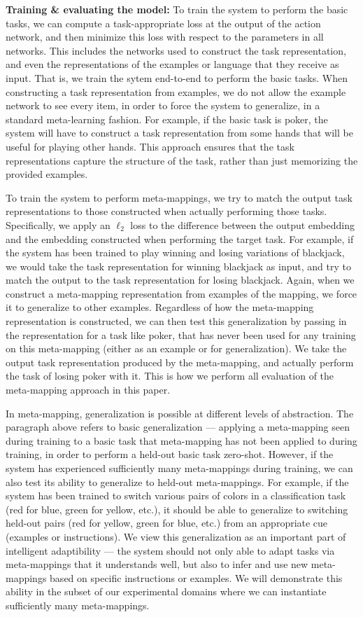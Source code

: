 \textbf{Training \& evaluating the model:} To train the system to perform the basic tasks, we can compute a task-appropriate loss at the output of the action network, and then minimize this loss with respect to the parameters in all networks. This includes the networks used to construct the task representation, and even the representations of the examples or language that they receive as input. That is, we train the sytem end-to-end to perform the basic tasks. When constructing a task representation from examples, we do not allow the example network to see every item, in order to force the system to generalize, in a standard meta-learning fashion. For example, if the basic task is poker, the system will have to construct a task representation from some hands that will be useful for playing other hands. This approach ensures that the task representations capture the structure of the task, rather than just memorizing the provided examples. 

To train the system to perform meta-mappings, we try to match the output task representations to those constructed when actually performing those tasks. Specifically, we apply an \(\ell_2\) loss to the difference between the output embedding and the embedding constructed when performing the target task. For example, if the system has been trained to play winning and losing variations of blackjack, we would take the task representation for winning blackjack as input, and try to match the output to the task representation for losing blackjack. Again, when we construct a meta-mapping representation from examples of the mapping, we force it to generalize to other examples. Regardless of how the meta-mapping representation is constructed, we can then test this generalization by passing in the representation for a task like poker, that has never been used for any training on this meta-mapping (either as an example or for generalization). We take the output task representation produced by the meta-mapping, and actually perform the task of losing poker with it. This is how we perform all evaluation of the meta-mapping approach in this paper.

In meta-mapping, generalization is possible at different levels of abstraction. The paragraph above refers to basic generalization --- applying a meta-mapping seen during training to a basic task that meta-mapping has not been applied to during training, in order to perform a held-out basic task zero-shot. However, if the system has experienced sufficiently many meta-mappings during training, we can also test its ability to generalize to held-out meta-mappings. For example, if the system has been trained to switch various pairs of colors in a classification task (red for blue, green for yellow, etc.), it should be able to generalize to switching held-out pairs (red for yellow, green for blue, etc.) from an appropriate cue (examples or instructions). We view this generalization as an important part of intelligent adaptibility --- the system should not only able to adapt tasks via meta-mappings that it understands well, but also to infer and use new meta-mappings based on specific instructions or examples. We will demonstrate this ability in the subset of our experimental domains where we can instantiate sufficiently many meta-mappings. 

